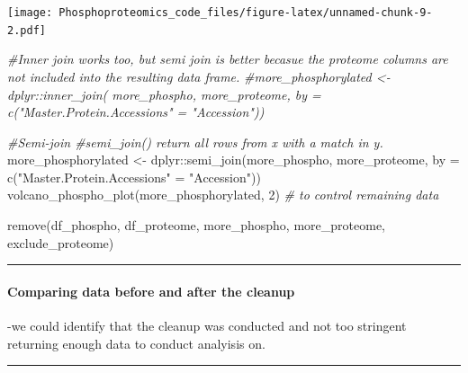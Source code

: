 \documentclass[
]{article}
\newenvironment{Shaded}{\begin{snugshade}}{\end{snugshade}}
\newcommand{\AttributeTok}[1]{\textcolor[rgb]{0.77,0.63,0.00}{#1}}
\newcommand{\CommentTok}[1]{\textcolor[rgb]{0.56,0.35,0.01}{\textit{#1}}}
\newcommand{\DecValTok}[1]{\textcolor[rgb]{0.00,0.00,0.81}{#1}}
\newcommand{\FunctionTok}[1]{\textcolor[rgb]{0.00,0.00,0.00}{#1}}
\newcommand{\NormalTok}[1]{#1}
\newcommand{\OtherTok}[1]{\textcolor[rgb]{0.56,0.35,0.01}{#1}}
\newcommand{\SpecialCharTok}[1]{\textcolor[rgb]{0.00,0.00,0.00}{#1}}
\newcommand{\StringTok}[1]{\textcolor[rgb]{0.31,0.60,0.02}{#1}}
\begin{document}
\texttt{[image: Phosphoproteomics\_code\_files/figure-latex/unnamed-chunk-9-2.pdf]}

\begin{Shaded}
\begin{Highlighting}[]
  \CommentTok{\#Inner join works too, but semi join is better becasue the proteome columns are not included into the resulting data frame.}
  \CommentTok{\#more\_phosphorylated \textless{}{-} dplyr::inner\_join( more\_phospho, more\_proteome, by = c("Master.Protein.Accessions" = "Accession"))}
  
  \CommentTok{\#Semi{-}join \#semi\_join() return all rows from x with a match in y. }
\NormalTok{  more\_phosphorylated }\OtherTok{\textless{}{-}}\NormalTok{ dplyr}\SpecialCharTok{::}\FunctionTok{semi\_join}\NormalTok{(more\_phospho, more\_proteome, }\AttributeTok{by =} \FunctionTok{c}\NormalTok{(}\StringTok{"Master.Protein.Accessions"} \OtherTok{=} \StringTok{"Accession"}\NormalTok{))}
  \FunctionTok{volcano\_phospho\_plot}\NormalTok{(more\_phosphorylated, }\DecValTok{2}\NormalTok{) }\CommentTok{\# to control remaining data}
  
\FunctionTok{remove}\NormalTok{(df\_phospho, df\_proteome, more\_phospho, more\_proteome, exclude\_proteome)}
\end{Highlighting}
\end{Shaded}

\begin{center}\rule{0.5\linewidth}{0.5pt}\end{center}

\hypertarget{comparing-data-before-and-after-the-cleanup}{%
\paragraph{Comparing data before and after the
cleanup}\label{comparing-data-before-and-after-the-cleanup}}

-we could identify that the cleanup was conducted and not too stringent
returning enough data to conduct analyisis on.

\begin{center}\rule{0.5\linewidth}{0.5pt}\end{center}
\end{document}
